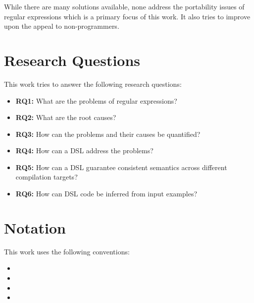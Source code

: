 While there are many solutions available, none address the portability issues of regular expressions which is a primary focus of this work. It also tries to improve upon the appeal to non-programmers.

\section{Research Questions}

This work tries to answer the following research questions:


\newcommand*{\RQone}{What are the problems of regular expressions?}
\newcommand*{\RQtwo}{What are the root causes?}
\newcommand*{\RQthree}{How can the problems and their causes be quantified?}
\newcommand*{\RQfour}{How can a DSL address the problems?}
\newcommand*{\RQfive}{How can a DSL guarantee consistent semantics across different compilation targets?}
\newcommand*{\RQsix}{How can DSL code be inferred from input examples?}

\begin{itemize}
    \item \textbf{RQ1:} \RQone
    \item \textbf{RQ2:} \RQtwo
    \item \textbf{RQ3:} \RQthree
    \item \textbf{RQ4:} \RQfour
    \item \textbf{RQ5:} \RQfive
    \item \textbf{RQ6:} \RQsix
\end{itemize}

\section{Notation}

This work uses the following conventions:

\begin{itemize}
    \item {}
    \item {}
    \item {}
    \item {}
\end{itemize}
